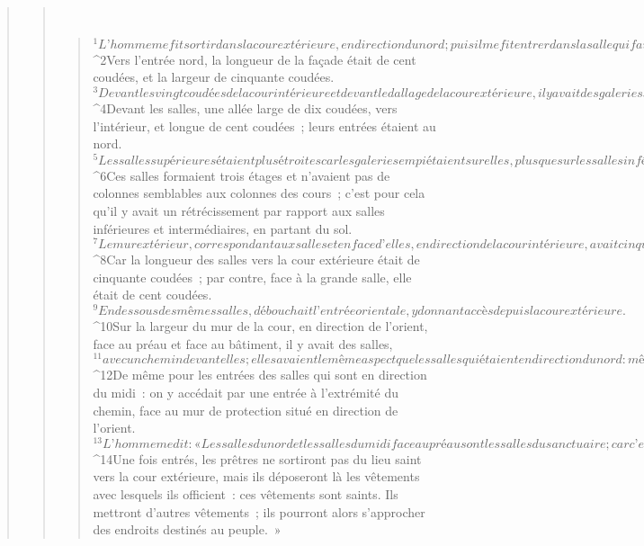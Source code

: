 \begin{verse}
\begin{verse}
         
      \bchapter{}
      \begin{verse}
${}^{1}L’homme me fit sortir dans la cour extérieure, en direction du nord ; puis il me fit entrer dans la salle qui fait face au préau et au bâtiment, vers le nord. 
${}^{2}Vers l’entrée nord, la longueur de la façade était de cent coudées, et la largeur de cinquante coudées. 
${}^{3}Devant les vingt coudées de la cour intérieure et devant le dallage de la cour extérieure, il y avait des galeries superposées sur trois étages. 
${}^{4}Devant les salles, une allée large de dix coudées, vers l’intérieur, et longue de cent coudées ; leurs entrées étaient au nord. 
${}^{5}Les salles supérieures étaient plus étroites car les galeries empiétaient sur elles, plus que sur les salles inférieures et intermédiaires du bâtiment.
${}^{6}Ces salles formaient trois étages et n’avaient pas de colonnes semblables aux colonnes des cours ; c’est pour cela qu’il y avait un rétrécissement par rapport aux salles inférieures et intermédiaires, en partant du sol. 
${}^{7}Le mur extérieur, correspondant aux salles et en face d’elles, en direction de la cour intérieure, avait cinquante coudées de long. 
${}^{8}Car la longueur des salles vers la cour extérieure était de cinquante coudées ; par contre, face à la grande salle, elle était de cent coudées. 
${}^{9}En dessous des mêmes salles, débouchait l’entrée orientale, y donnant accès depuis la cour extérieure. 
${}^{10}Sur la largeur du mur de la cour, en direction de l’orient, face au préau et face au bâtiment, il y avait des salles, 
${}^{11}avec un chemin devant elles ; elles avaient le même aspect que les salles qui étaient en direction du nord : même longueur et même largeur, mêmes sorties, même ordonnance et mêmes entrées. 
${}^{12}De même pour les entrées des salles qui sont en direction du midi : on y accédait par une entrée à l’extrémité du chemin, face au mur de protection situé en direction de l’orient.
${}^{13}L’homme me dit : « Les salles du nord et les salles du midi face au préau sont les salles du sanctuaire ; car c’est là que les prêtres qui s’approchent du Seigneur mangent les choses très saintes. C’est là qu’ils déposent les choses très saintes : l’offrande de céréales, les victimes du sacrifice pour la faute et du sacrifice de réparation. Ce lieu est saint. 
${}^{14}Une fois entrés, les prêtres ne sortiront pas du lieu saint vers la cour extérieure, mais ils déposeront là les vêtements avec lesquels ils officient : ces vêtements sont saints. Ils mettront d’autres vêtements ; ils pourront alors s’approcher des endroits destinés au peuple. »

\end{verse}
\end{verse}
\end{verse}
